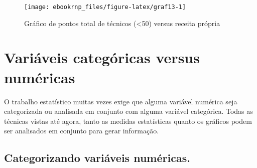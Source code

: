 \documentclass[12pt,]{style/krantz}
\makeatletter
\newenvironment{Shaded}{\begin{snugshade}}{\end{snugshade}}
\newcommand{\DataTypeTok}[1]{\textcolor[rgb]{0.13,0.29,0.53}{#1}}
\newcommand{\DecValTok}[1]{\textcolor[rgb]{0.00,0.00,0.81}{#1}}
\newcommand{\KeywordTok}[1]{\textcolor[rgb]{0.13,0.29,0.53}{\textbf{#1}}}
\newcommand{\NormalTok}[1]{#1}
\newcommand{\OperatorTok}[1]{\textcolor[rgb]{0.81,0.36,0.00}{\textbf{#1}}}
\newcommand{\StringTok}[1]{\textcolor[rgb]{0.31,0.60,0.02}{#1}}
\newenvironment{kframe}{%
\medskip{}
\setlength{\fboxsep}{.8em}
 \def\at@end@of@kframe{}%
 \ifinner\ifhmode%
  \def\at@end@of@kframe{\end{minipage}}%
  \begin{minipage}{\columnwidth}%
 \fi\fi%
 \def\FrameCommand##1{\hskip\@totalleftmargin \hskip-\fboxsep
 \colorbox{shadecolor}{##1}\hskip-\fboxsep
     \hskip-\linewidth \hskip-\@totalleftmargin \hskip\columnwidth}%
 \MakeFramed {\advance\hsize-\width
   \@totalleftmargin\z@ \linewidth\hsize
   \@setminipage}}%
 {\par\unskip\endMakeFramed%
 \at@end@of@kframe}
\renewenvironment{Shaded}{\begin{kframe}}{\end{kframe}}
\theoremstyle{definition}
\theoremstyle{definition}
\theoremstyle{definition}
\theoremstyle{remark}
\makeatother
\begin{document}
\begin{Shaded}
\end{Shaded}

\begin{figure}[H]

{\centering \texttt{[image: ebookrnp\_files/figure-latex/graf13-1]} 

}

\caption{Gráfico de pontos total de técnicos (<50) versus receita própria}\label{fig:graf13}
\end{figure}

\hypertarget{variaveis-categoricas-versus-numericas}{%
\section{Variáveis categóricas versus numéricas}\label{variaveis-categoricas-versus-numericas}}

O trabalho estatístico muitas vezes exige que alguma variável numérica seja categorizada ou analisada em conjunto com alguma variável categórica. Todas as técnicas vistas até agora, tanto as medidas estatísticas quanto os gráficos podem ser analisados em conjunto para gerar informação.

\hypertarget{categorizando-variaveis-numericas.}{%
\subsection{Categorizando variáveis numéricas.}\label{categorizando-variaveis-numericas.}}
\end{document}
